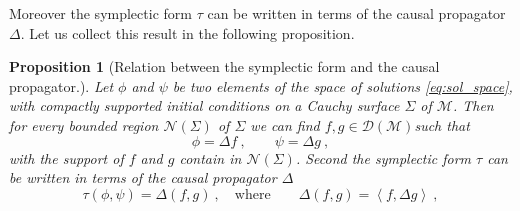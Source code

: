 \documentclass[11pt]{book}
\newcommand{\sm}[1]{\left\langle#1\right\rangle}
\newcommand{\Dcal}{\mathcal{D}}
\newcommand{\Mcal}{\mathcal{M}}
\newcommand{\Ncal}{\mathcal{N}}
\theoremstyle{break}
\newtheorem{proposition}{Proposition}[chapter]
\begin{document}
Moreover the symplectic form $\tau$ can be written in terms of the causal propagator $\Delta$. Let us collect this result in the following proposition.


\begin{proposition}[Relation between the symplectic form and the causal propagator.]
Let $\phi$ and $\psi$ be two elements of the space of solutions \eqref{eq:sol_space}, with compactly supported initial conditions on a Cauchy surface $\Sigma$ of $\Mcal$. Then for every bounded region $\Ncal(\Sigma)$ of $\Sigma$ we can find $f,g \in \Dcal(\Mcal)$such that
%
\begin{equation*}
\phi = \Delta f \ , \qquad  \psi   =  \Delta g \ ,
\end{equation*}
%
with the support of $f$ and $g$ contain in $\Ncal(\Sigma)$. Second the symplectic form $\tau$ can be written in terms of the causal propagator $\Delta$ 
%
\begin{equation*}
\tau(\phi,\psi) = \Delta(f,g) \ , \quad \mbox{where} \qquad \Delta(f,g) = \sm{f,\Delta g} \ ,
\end{equation*}
%
\end{proposition}
\end{document}
